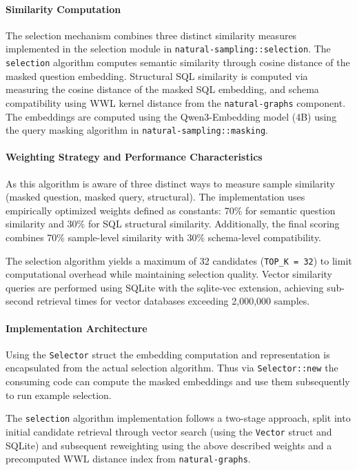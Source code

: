 \paragraph{Similarity Computation}

The selection mechanism combines three distinct similarity measures implemented
in the selection module in \texttt{natural-sampling::selection}. The 
\texttt{selection} algorithm computes semantic similarity through cosine
distance of the masked question embedding. Structural SQL similarity is
computed via measuring the cosine distance of the masked SQL embedding, and
schema compatibility using WWL kernel distance from the \texttt{natural-graphs}
component. The embeddings are computed using the Qwen3-Embedding model (4B)
using the query masking algorithm in \texttt{natural-sampling::masking}.

\paragraph{Weighting Strategy and Performance Characteristics}

As this algorithm is aware of three distinct ways to measure sample similarity
(masked question, masked query, structural). The implementation uses
empirically optimized weights defined as constants: 70\% for semantic question
similarity and 30\% for SQL structural similarity. Additionally, the final
scoring combines 70\% sample-level similarity with 30\% schema-level
compatibility.

The selection algorithm yields a maximum of 32 candidates (\texttt{TOP\_K =
32}) to limit computational overhead while maintaining selection quality.
Vector similarity queries are performed using SQLite with the sqlite-vec
extension, achieving sub-second retrieval times for vector databases exceeding
2,000,000 samples.

\paragraph{Implementation Architecture}

Using the \texttt{Selector} struct the embedding computation and representation
is encapsulated from the actual selection algorithm. Thus via
\texttt{Selector::new} the consuming code can compute the masked embeddings and
use them subsequently to run example selection.

The \texttt{selection} algorithm implementation follows a two-stage approach,
split into initial candidate retrieval through vector search (using the
\texttt{Vector} struct and SQLite) and subsequent reweighting using the above
described weights and a precomputed WWL distance index from
\texttt{natural-graphs}.

